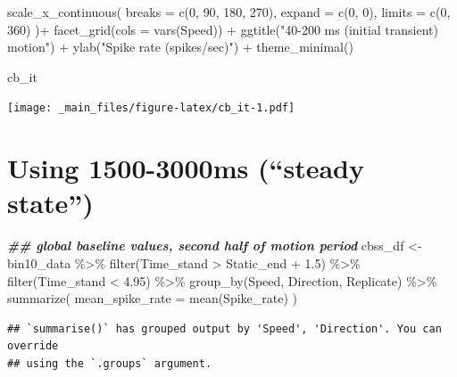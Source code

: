 \documentclass[
]{book}
\newenvironment{Shaded}{\begin{snugshade}}{\end{snugshade}}
\newcommand{\AttributeTok}[1]{\textcolor[rgb]{0.77,0.63,0.00}{#1}}
\newcommand{\DecValTok}[1]{\textcolor[rgb]{0.00,0.00,0.81}{#1}}
\newcommand{\DocumentationTok}[1]{\textcolor[rgb]{0.56,0.35,0.01}{\textbf{\textit{#1}}}}
\newcommand{\FloatTok}[1]{\textcolor[rgb]{0.00,0.00,0.81}{#1}}
\newcommand{\FunctionTok}[1]{\textcolor[rgb]{0.00,0.00,0.00}{#1}}
\newcommand{\NormalTok}[1]{#1}
\newcommand{\OtherTok}[1]{\textcolor[rgb]{0.56,0.35,0.01}{#1}}
\newcommand{\SpecialCharTok}[1]{\textcolor[rgb]{0.00,0.00,0.00}{#1}}
\newcommand{\StringTok}[1]{\textcolor[rgb]{0.31,0.60,0.02}{#1}}
\begin{document}
\begin{Shaded}
\begin{Highlighting}[]
  \FunctionTok{scale\_x\_continuous}\NormalTok{(}
    \AttributeTok{breaks =} \FunctionTok{c}\NormalTok{(}\DecValTok{0}\NormalTok{, }\DecValTok{90}\NormalTok{, }\DecValTok{180}\NormalTok{, }\DecValTok{270}\NormalTok{),}
    \AttributeTok{expand =} \FunctionTok{c}\NormalTok{(}\DecValTok{0}\NormalTok{, }\DecValTok{0}\NormalTok{),}
    \AttributeTok{limits =} \FunctionTok{c}\NormalTok{(}\DecValTok{0}\NormalTok{, }\DecValTok{360}\NormalTok{)}
\NormalTok{  )}\SpecialCharTok{+}
  \FunctionTok{facet\_grid}\NormalTok{(}\AttributeTok{cols =} \FunctionTok{vars}\NormalTok{(Speed)) }\SpecialCharTok{+}
  \FunctionTok{ggtitle}\NormalTok{(}\StringTok{"40{-}200 ms (initial transient) motion"}\NormalTok{) }\SpecialCharTok{+}
  \FunctionTok{ylab}\NormalTok{(}\StringTok{"Spike rate (spikes/sec)"}\NormalTok{) }\SpecialCharTok{+}
  \FunctionTok{theme\_minimal}\NormalTok{()}

\NormalTok{cb\_it}
\end{Highlighting}
\end{Shaded}

\texttt{[image: \_main\_files/figure-latex/cb\_it-1.pdf]}

\hypertarget{using-1500-3000ms-steady-state}{%
\section{Using 1500-3000ms (``steady state'')}\label{using-1500-3000ms-steady-state}}

\begin{Shaded}
\begin{Highlighting}[]
\DocumentationTok{\#\# global baseline values, second half of motion period}
\NormalTok{cbss\_df }\OtherTok{\textless{}{-}}
\NormalTok{  bin10\_data }\SpecialCharTok{\%\textgreater{}\%}
  \FunctionTok{filter}\NormalTok{(Time\_stand }\SpecialCharTok{\textgreater{}}\NormalTok{ Static\_end }\SpecialCharTok{+} \FloatTok{1.5}\NormalTok{) }\SpecialCharTok{\%\textgreater{}\%}
  \FunctionTok{filter}\NormalTok{(Time\_stand }\SpecialCharTok{\textless{}} \FloatTok{4.95}\NormalTok{) }\SpecialCharTok{\%\textgreater{}\%}
  \FunctionTok{group\_by}\NormalTok{(Speed, Direction, Replicate) }\SpecialCharTok{\%\textgreater{}\%}
  \FunctionTok{summarize}\NormalTok{(}
    \AttributeTok{mean\_spike\_rate =} \FunctionTok{mean}\NormalTok{(Spike\_rate)}
\NormalTok{  )}
\end{Highlighting}
\end{Shaded}

\begin{verbatim}
## `summarise()` has grouped output by 'Speed', 'Direction'. You can override
## using the `.groups` argument.
\end{verbatim}
\end{document}
